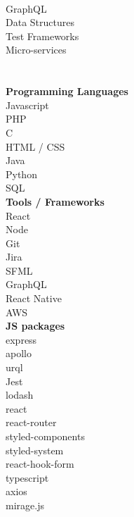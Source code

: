 \documentclass[8pt]{developercv}
\newcommand{\CC}{C\nolinebreak\hspace{-.05em}\raisebox{.4ex}{\tiny\bf +}\nolinebreak\hspace{-.10em}\raisebox{.4ex}{\tiny\bf +}}
\def\CC{{C\nolinebreak[4]\hspace{-.05em}\raisebox{.4ex}{\tiny\bf ++}}}
\begin{document}
\begin{minipage}[t]{0.05\textwidth}
\hphantom{0.1}
\end{minipage}
	\begin{minipage}[t]{0.3\textwidth}		%
		\\
		{GraphQL}\\
		{Data Structures}\\
		{Test Frameworks}\\
		{Micro-services}\\
		
		\\
		\\\textbf{Programming Languages}\\
		{Javascript}\\
		{PHP}\\
		{\CC}\\
		{HTML / CSS}\\
		{Java}\\
		{Python}\\
		{SQL}\\

		\textbf{Tools / Frameworks}\\
		{React}\\
		{Node}\\
		{Git}\\
		{Jira}\\
		{SFML}\\
		{GraphQL}\\
		{React Native}\\
		{AWS}\\
		
		\textbf{JS packages}\\
		{express}\\
		{apollo}\\
		{urql}\\
		{Jest}\\
		{lodash}\\
		{react}\\
		{react-router}\\
		{styled-components}\\
		{styled-system}\\
		{react-hook-form}\\
		{typescript}\\
		{axios}\\
		{mirage.js}\\

	\end{minipage}
\end{document}
